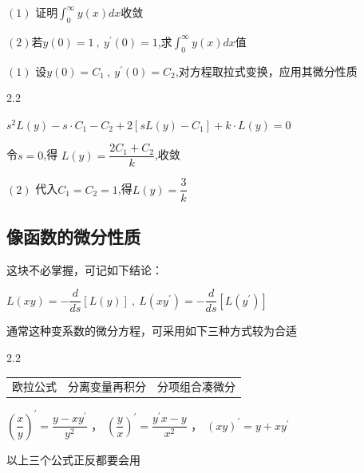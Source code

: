 $(1)$ 证明$\int_{0}^{\infty}y\left(x\right)dx$收敛

$(2)$若$y\left(0\right)=1\:,\:y^{\prime}\left(0\right)=1$,求$\int_{0}^{\infty}y\left(x\right)dx$值

\vspace{10pt}

 \hspace{0.2em} $(1)$ 设$y\left(0\right)=C_{1}\:,\:y^{\prime}\left(0\right)=C_{2}$,对方程取拉式变换，应用其微分性质

\vspace{-10pt}

\begin{spacing}{2.2}
	\begin{center}
		$s^{2}L\left(y\right)-s\cdot C_{1}-C_{2}+2\left\lbrack sL\left(y\right)-C_{1}\right\rbrack+k\cdot L\left(y\right)=0$
		
		令$s=0$,得 $L\left(y\right)=\dfrac{2C_{1}+C_{2}}{k}$,收敛
	\end{center}
\end{spacing}

\vspace{-5pt}

\hspace{3em}$(2)$ 代入$C_{1}=C_{2}=1$,得$L\left(y\right)=\dfrac{3}{k}$

\clearpage

\subsection{像函数的微分性质}

这块不必掌握，可记如下结论：

\begin{center}
	$L\left(xy\right)=-\dfrac{d}{ds}\left\lbrack L\left(y\right)\right\rbrack\:,\:L\left(xy^{\prime}\right)=-\dfrac{d}{ds}\left\lbrack L\left(y^{\prime}\right)\right\rbrack\:$
\end{center}

通常这种变系数的微分方程，可采用如下三种方式较为合适

\vspace{-20pt}

\begin{spacing}{2.2}
	\begin{center}
		\begin{tabular}{ccc}
			\textbullet \hspace{0.5em} 欧拉公式  &  \textbullet \hspace{0.5em} 分离变量再积分  & \textbullet \hspace{0.5em} 分项组合凑微分 
		\end{tabular} 
		
		\vspace{5pt}
		
		$\left(\dfrac{x}{y}\right)^{\prime}=\dfrac{y-xy^{\prime}}{y^{2}}$ ，\hspace{2em}
		$\left(\dfrac{y}{x}\right)^{\prime}=\dfrac{y^{\prime}x-y}{x^{2}}$ ，\hspace{2em}
		$\left(xy\right)^{\prime}=y+xy^{\prime}$
		
		以上三个公式正反都要会用
	\end{center}
\end{spacing}

